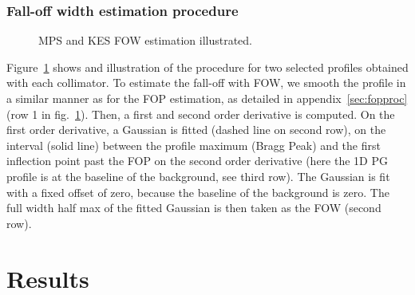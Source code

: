 \documentclass[a4paper,english]{article}
\begin{document}
\subsubsection{Fall-off width estimation procedure}

\begin{figure}[htp]
  \centering
  \quad
  \caption{\label{FOWILLUS} MPS and KES FOW estimation illustrated.}
\end{figure}

Figure~\ref{FOWILLUS} shows and illustration of the procedure for two selected profiles obtained with each collimator. To estimate the fall-off with FOW, we smooth the profile in a similar manner as for the FOP estimation, as detailed in appendix~\ref{sec:fopproc} (row 1 in fig.~\ref{FOWILLUS}). Then, a first and second order derivative is computed. On the first order derivative, a Gaussian is fitted (dashed line on second row), on the interval (solid line) between the profile maximum (Bragg Peak) and the first inflection point past the FOP on the second order derivative (here the 1D PG profile is at the baseline of the background, see third row). The Gaussian is fit with a fixed offset of zero, because the baseline of the background is zero. The full width half max of the fitted Gaussian is then taken as the FOW (second row).

\section{Results}
\end{document}
